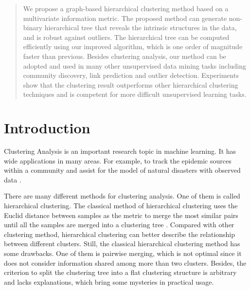 

\date{Received: date / Accepted: date}


\maketitle

\begin{abstract}
We propose a graph-based hierarchical clustering method based on a multivariate information metric.
The proposed method can generate non-binary hierarchical tree that reveals the intrinsic structures in the data, and is robust against outliers. 
The hierarchical tree can be computed efficiently using
our improved algorithm, which is one order of magnitude faster than previous.
Besides clustering analysis, our method can be adopted and
used in many other unsupervised data mining tasks including community discovery, link prediction and outlier detection.
Experiments show that the clustering result outperforms
other hierarchical clustering techniques and is competent for more difficult unsupervised learning tasks.
\end{abstract}

\section{Introduction}
\label{intro}
Clustering Analysis is an important research topic in machine learning.
It has wide applications in many areas. For example, to track the epidemic
sources within a community \citep{epidemic2020} and assist for the model of natural disasters with observed data \citep{earthquake2016}.

There are many different methods for clustering analysis. One of them is called
hierarchical clustering. The classical method of hierarchical clustering uses the Euclid distance between samples
as the metric to merge the most similar pairs until all the samples are merged into a clustering
tree \citep{slink}. Compared with other clustering method, hierarchical clustering can better describe the relationship between different clusters. Still, the classical hierarchical clustering method has some
drawbacks. One of them is pairwise merging, which is not optimal since it does not consider information shared among more than two clusters. Besides, the criterion to split the clustering tree into a flat clustering structure is arbitrary and lacks explanations, which bring some mysteries in practical
usage.

